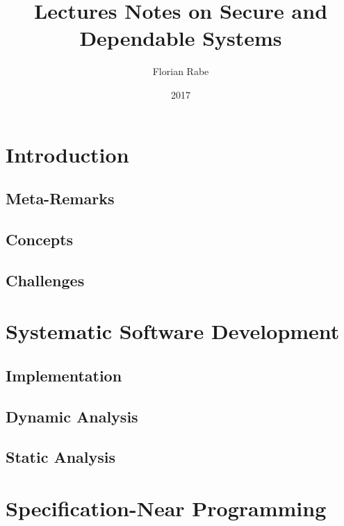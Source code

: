 \documentclass{book}
\title{Lectures Notes on Secure and Dependable Systems}
\author{Florian Rabe}
\date{2017}
\begin{document}
\maketitle

\tableofcontents
\newpage

\part{Introduction}

 \chapter{Meta-Remarks}
  

  \chapter{Concepts}
   

 \chapter{Challenges}
   

\part{Systematic Software Development}

  \chapter{Implementation}\label{sec:sd:systimpl}
    

  \chapter{Dynamic Analysis}\label{sec:sd:dynamic}
    

  \chapter{Static Analysis}\label{sec:sd:static}
    
    
\part{Specification-Near Programming}
\end{document}
